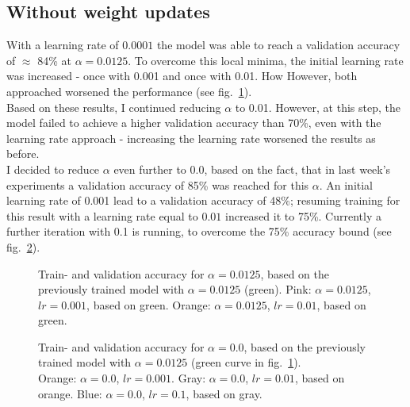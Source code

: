 \documentclass[10pt,twocolumn,letterpaper]{article}
\begin{document}
\subsection{Without weight updates}\label{noupdates}
With a learning rate of $0.0001$ the model was able to reach a validation accuracy of $\approx$ 84\% at $\alpha=0.0125$.
To overcome this local minima, the initial learning rate was increased - once with 0.001 and once with 0.01.
How
However, both approached worsened the performance (see fig.~\ref{fig:no-updates-2}).\\
Based on these results, I continued reducing $\alpha$ to 0.01.
However, at this step, the model failed to achieve a higher validation accuracy than 70\%, even with the learning rate approach - increasing the learning rate worsened the results as before.\\
I decided to reduce $\alpha$ even further to 0.0, based on the fact, that in last week's experiments a validation accuracy of 85\% was reached for this $\alpha$.
An initial learning rate of 0.001 lead to a validation accuracy of 48\%; resuming training for this result with a learning rate equal to $0.01$ increased it to 75\%.
Currently a further iteration with 0.1 is running, to overcome the 75\% accuracy bound (see fig.~\ref{fig:no-updates}).
\begin{figure}[hpbt]
	\centering
	\centering
	\hspace{0.1\textwidth}
	\caption[]{Train- and validation accuracy for $\alpha=0.0125$, based on the previously trained model with $\alpha=0.0125$ (green).
		Pink: $\alpha=0.0125$, $lr=0.001$, based on green.
		Orange: $\alpha=0.0125$, $lr=0.01$, based on green.}
	\label{fig:no-updates-2}
\end{figure}
\begin{figure}[hpbt]
	\centering
	\centering
	\hspace{0.1\textwidth}
	\caption[]{Train- and validation accuracy for $\alpha=0.0$, based on the previously trained model with $\alpha=0.0125$ (green curve in fig.~\ref{fig:no-updates-2}).\\
		Orange: $\alpha=0.0$, $lr=0.001$.
		Gray: $\alpha=0.0$, $lr=0.01$, based on orange.
		Blue: $\alpha=0.0$, $lr=0.1$, based on gray.}
	\label{fig:no-updates}
\end{figure}
\end{document}
